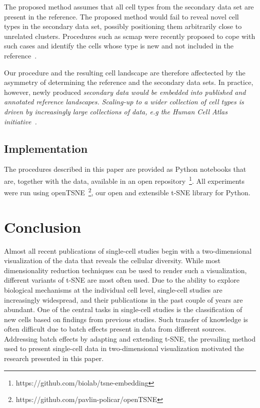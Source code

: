 \documentclass[runningheads]{llncs}
\begin{document}
The proposed method assumes that all cell types from the secondary data set are
present in the reference. The proposed method would fail to reveal novel cell
types in the secondary data set, possibly positioning them arbitrarily close to
unrelated clusters. Procedures such as scmap were recently
proposed to cope with such cases and identify the cells whose type is new and
not included in the reference~\cite{scmap}.

Our procedure and the resulting cell landscape are therefore affectected by the asymmetry
of determining the reference and the secondary data sets. In practice, however,
newly produced \em secondary \em data would be embedded into published and
annotated reference landscapes. Scaling-up to a wider collection of cell
types is driven by increasingly large collections of data, e.g the Human Cell
Atlas initiative~\cite{hca}. 


\subsection{Implementation\label{sec:implementation}}

The procedures described in this paper are provided as Python notebooks that
are, together with the data, available in an open
repository~\footnote{https://github.com/biolab/tsne-embedding}. All experiments
were run using openTSNE~\footnote{https://github.com/pavlin-policar/openTSNE},
our open and extensible t-SNE library for Python.

\section{Conclusion}

Almost all recent publications of single-cell studies begin with a
two-dimensional visualization of the data that reveals the cellular diversity. 
While most dimensionality reduction
techniques can be used to render such a visualization, different variants of
t-SNE are most often used. Due to the ability to explore biological mechanisms
at the individual cell level, single-cell studies are increasingly widespread, and
their publications in the past couple of years are abundant. One of the central
tasks in single-cell studies is the classification of new cells based on
findings from previous studies. Such transfer of knowledge is often difficult
due to batch effects present in data from different sources.
Addressing batch effects by adapting and extending t-SNE, the prevailing method used
to present single-cell data in two-dimensional visualization motivated the research
presented in this paper. 
\end{document}
